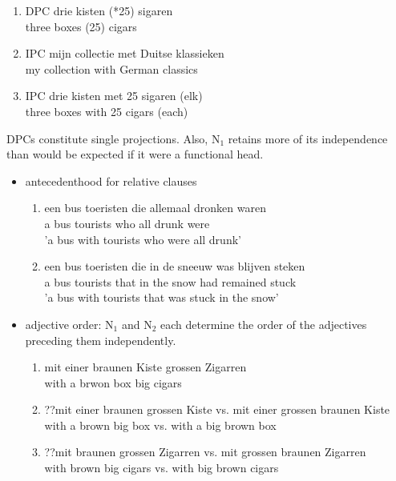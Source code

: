 \documentclass{article}
\begin{document}
\begin{itemize}
\begin{example}
\begin{enumerate}
\item DPC
\gll drie kisten (*25) sigaren\\
three boxes (25) cigars\\
   \glt
   \glend
\item IPC
\gll mijn collectie met Duitse klassieken\\
my collection with German classics\\

\item IPC
\gll drie kisten met 25 sigaren (elk)\\
three boxes with 25 cigars (each)\\

\end{enumerate}
   \end{example}

\end{itemize}
 DPCs constitute single projections. Also, N$_{1}$ retains more of its independence than would be expected if it were a functional head. 

\begin{itemize}
\item antecedenthood for relative clauses
\begin{example}
\label{}
\begin{enumerate}
\item  
 \gll een bus toeristen die allemaal dronken waren\\
 a bus tourists who all drunk were\\
 'a bus with tourists who were all drunk'
 \item
 \gll een bus toeristen die in de sneeuw was blijven steken\\
 a bus tourists that in the snow had remained stuck\\
 'a bus with tourists that was stuck in the snow'
\end{enumerate}
   \glt
   \glend
   \end{example}
\item adjective order: N$_{1}$ and N$_{2}$ each determine the order of the adjectives preceding them independently.
\begin{example}
\label{German adjectives}
\begin{enumerate}
\item  
 \gll mit einer braunen Kiste grossen Zigarren\\
 with a brwon box big cigars\\
 \item
 \gll ??mit einer braunen grossen Kiste vs. mit einer grossen braunen Kiste\\
 with a brown big box vs. with a big brown box\\
 \item
 \gll ??mit braunen grossen Zigarren vs. mit grossen braunen Zigarren\\
 with brown big cigars vs. with big brown cigars\\
   \glt
   \glend
 \end{enumerate}
   \end{example}
 \end{itemize}
\end{document}
